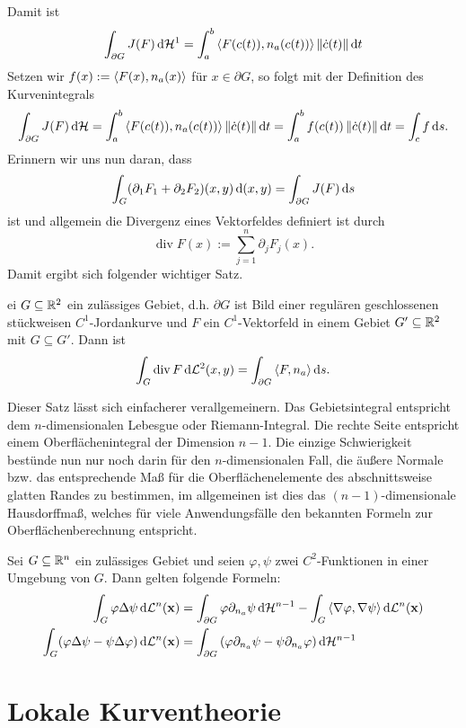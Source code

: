 \documentclass[
pdftex,
oneside,
headsepline,
11pt, 
]{scrreprt}
\begin{document}
Damit ist \[  \int_{\partial G} J(F) \mathop{}\!\mathrm{d} \mathcal{H}^1=\int_a^b \left\langle F(c(t)),n_a(c(t)) \right\rangle\left\lVert\dot{c}(t)\right\rVert\mathop{}\!\mathrm{d} t \]   
Setzen wir $f(x):=\left\langle F(x),n_a(x) \right\rangle$ für $x\in\partial G$, so folgt mit der Definition des Kurvenintegrals
\[ \int_{\partial G} J(F) \mathop{}\!\mathrm{d} \mathcal{H}= \int_a^b \left\langle F(c(t)),n_a(c(t)) \right\rangle\left\lVert\dot{c}(t)\right\rVert\mathop{}\!\mathrm{d} t =\int_a^b f(c(t))\left\lVert\dot{c}(t)\right\rVert\mathop{}\!\mathrm{d} t=\int_c f \mathop{}\!\mathrm{d} s.\] Erinnern wir uns nun daran, dass \[  \int_G (\partial_1 F_1+\partial_2F_2)(x,y)\mathop{}\!\mathrm{d} (x,y)=\int_{\partial G}J(F)\mathop{}\!\mathrm{d} s \] ist und allgemein die Divergenz eines Vektorfeldes definiert ist durch \[ \operatorname{div} F(x):=\sum_{j=1}^n \partial_jF_j(x).\] Damit ergibt sich folgender wichtiger Satz.
\begin{theo}
	ei $G\subseteq \mathbb{R}^2$ ein zulässiges Gebiet, d.h. $\partial G$ ist Bild einer regulären geschlossenen stückweisen $C^1$-Jordankurve und $F$ ein $C^1$-Vektorfeld in einem Gebiet $G'\subseteq \mathbb{R}^2$ mit $G\subseteq G'$. Dann ist \[  \int_G \operatorname{div} F \mathop{}\!\mathrm{d} \mathcal{L}^2(x,y)=\int_{\partial G} \left\langle F,n_a \right\rangle \mathop{}\!\mathrm{d} s. \]
\end{theo}
Dieser Satz lässt sich einfacherer verallgemeinern. Das Gebietsintegral entspricht dem $n$-dimensionalen Lebesgue oder  Riemann-Integral. Die rechte Seite entspricht einem Oberflächenintegral der Dimension $n-1$. Die einzige Schwierigkeit bestünde nun nur noch darin für den $n$-dimensionalen Fall, die äußere Normale bzw. das entsprechende Maß für die Oberflächenelemente des abschnittsweise glatten Randes zu bestimmen, im allgemeinen ist dies das $(n-1)$-dimensionale Hausdorffmaß, welches für viele Anwendungsfälle den bekannten Formeln zur Oberflächenberechnung entspricht. 
\begin{theo} Sei $G\subseteq \mathbb{R}^n$ ein zulässiges Gebiet und seien $\varphi,\psi$ zwei $C^2$-Funktionen in einer Umgebung von $G$. Dann gelten folgende Formeln: 
	\begin{align*}
	\int_G \varphi \Delta \psi \mathop{}\!\mathrm{d} \mathcal{L}^n(\textnormal{\textbf{x}})&=\int_{\partial G}\varphi \partial_{n_a}\psi \mathop{}\!\mathrm{d} \mathcal{H}^{n-1}-\int_G\left\langle \nabla \varphi,\nabla \psi \right\rangle\mathop{}\!\mathrm{d} \mathcal{L}^n(\textnormal{\textbf{x}})\\
	\int_G (\varphi \Delta \psi-\psi\Delta\varphi) \mathop{}\!\mathrm{d} \mathcal{L}^n(\textnormal{\textbf{x}})&=\int_{\partial G}\left(  \varphi\partial_{n_a}\psi-\psi\partial_{n_a}\varphi \right)\mathop{}\!\mathrm{d} \mathcal{H}^{n-1}
	\end{align*}
\end{theo}
\chapter{Lokale Kurventheorie}
\end{document}
